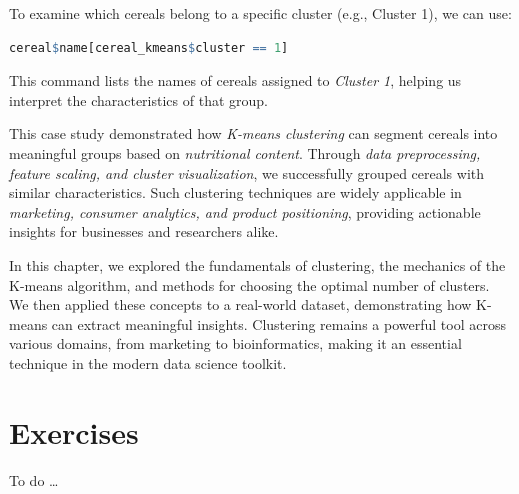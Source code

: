 \documentclass[
]{book}
\theoremstyle{definition}
\theoremstyle{definition}
\theoremstyle{definition}
\theoremstyle{definition}
\theoremstyle{remark}
\begin{document}
To examine which cereals belong to a specific cluster (e.g., Cluster 1), we can use:

\begin{lstlisting}[language=R]
cereal$name[cereal_kmeans$cluster == 1]
\end{lstlisting}

This command lists the names of cereals assigned to \emph{Cluster 1}, helping us interpret the characteristics of that group.

This case study demonstrated how \emph{K-means clustering} can segment cereals into meaningful groups based on \emph{nutritional content}. Through \emph{data preprocessing, feature scaling, and cluster visualization}, we successfully grouped cereals with similar characteristics. Such clustering techniques are widely applicable in \emph{marketing, consumer analytics, and product positioning}, providing actionable insights for businesses and researchers alike.

In this chapter, we explored the fundamentals of clustering, the mechanics of the K-means algorithm, and methods for choosing the optimal number of clusters. We then applied these concepts to a real-world dataset, demonstrating how K-means can extract meaningful insights. Clustering remains a powerful tool across various domains, from marketing to bioinformatics, making it an essential technique in the modern data science toolkit.

\section{Exercises}\label{exercises-11}

To do \ldots{}

  
\end{document}
